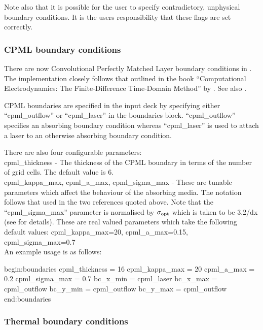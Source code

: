 Note also that it is possible for the user to specify contradictory,
unphysical boundary conditions. It is the users responsibility that these
flags are set correctly.


\subsubsection{CPML boundary conditions}
\label{sec:cpml}
There are now Convolutional Perfectly Matched Layer boundary conditions
in {\EPOCH}. The implementation closely follows that outlined in the book
``Computational Electrodynamics: The Finite-Difference Time-Domain Method'' by
\citet{Taflove}.  See also \citet{Roden}.

CPML boundaries are specified in the input deck by specifying either
``cpml\_outflow'' or ``cpml\_laser'' in the boundaries block. ``cpml\_outflow''
specifies an absorbing boundary condition whereas ``cpml\_laser'' is used
to attach a laser to an otherwise absorbing boundary condition.

There are also four configurable parameters:\\

{\emphtext cpml\_thickness} - The thickness of the CPML boundary in terms of the
  number of grid cells. The default value is 6.\\

{\emphtext cpml\_kappa\_max}, {\emphtext cpml\_a\_max},
{\emphtext cpml\_sigma\_max} - These are tunable parameters which affect the
  behaviour of the absorbing media. The notation follows that used in the two
  references quoted above. Note that the ``cpml\_sigma\_max'' parameter is
  normalised by $\sigma_{\rm opt}$ which is taken to be 3.2/dx (see
  \citet{Taflove} for details). These are real valued
  parameters which take the following default values: cpml\_kappa\_max=20,
  cpml\_a\_max=0.15, cpml\_sigma\_max=0.7\\

An example usage is as follows:

{\samepage
\begin{boxverbatim}
begin:boundaries
   cpml_thickness = 16
   cpml_kappa_max = 20
   cpml_a_max = 0.2
   cpml_sigma_max = 0.7
   bc_x_min = cpml_laser
   bc_x_max = cpml_outflow
   bc_y_min = cpml_outflow
   bc_y_max = cpml_outflow
end:boundaries
\end{boxverbatim}
}

\subsubsection{Thermal boundary conditions}
\label{sec:thermal}

